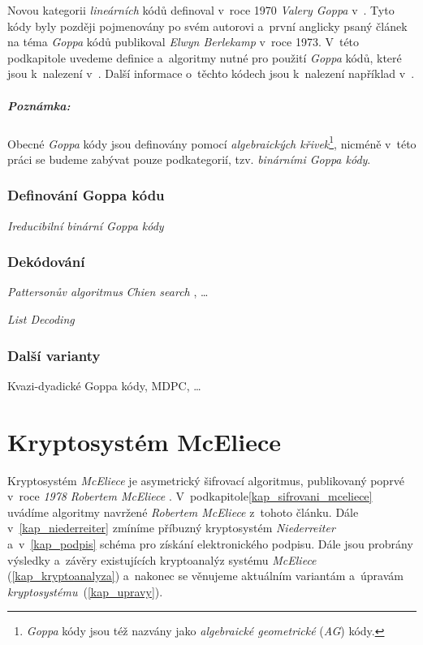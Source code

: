\documentclass[thesis=M,czech,hidelinks]{FITthesis}[2012/06/26]
\newcommand{\0}{{\textcolor[gray]{0.75}{0}}}
\begin{document}
Novou kategorii \emph{lineárních} kódů definoval v~roce 1970 \emph{Valery Goppa}
v~\cite{Goppa}. Tyto kódy byly později pojmenovány po svém autorovi a~první
anglicky psaný článek na téma \emph{Goppa} kódů publikoval \emph{Elwyn
Berlekamp} v~roce 1973. V~této podkapitole uvedeme definice a~algoritmy nutné
pro použití \emph{Goppa} kódů, které jsou k~nalezení
v~\cite{Berlekamp2,Engelbert}. Další informace o~těchto kódech jsou k~nalezení
například v~\cite{McEliece_coding}.

\paragraph{Poznámka:} Obecné \emph{Goppa} kódy jsou definovány pomocí
\emph{algebraických křivek}\footnote{
    \emph{Goppa} kódy jsou též nazvány jako \emph{algebraické geometrické}
    (\emph{AG}) kódy.
}, nicméně v~této práci se budeme zabývat pouze podkategorií, tzv.
\emph{binárními Goppa kódy}.

\subsection{Definování Goppa kódu}
\emph{Ireducibilní binární Goppa kódy}

\subsection{Dekódování}
\emph{Pattersonův algoritmus}
\cite{Patterson}
\emph{Chien search} , \ldots

\emph{List Decoding}  \cite{Repka,Bernstein2}

\subsection{Další varianty}
Kvazi-dyadické Goppa kódy, MDPC, \ldots




\chapter{Kryptosystém McEliece}\label{kap_mceliece}

Kryptosystém \emph{McEliece} je asymetrický šifrovací algoritmus, publikovaný
poprvé v~roce \emph{1978} \emph{Robertem McEliece} \cite{McEliece}.
V~podkapitole\ref{kap_sifrovani_mceliece} uvádíme algoritmy navržené
\emph{Robertem McEliece} z~tohoto článku. Dále v~\ref{kap_niederreiter} zmíníme
příbuzný kryptosystém \emph{Niederreiter} a~v~\ref{kap_podpis} schéma pro
získání elektronického podpisu. Dále jsou probrány výsledky a~závěry
existujících kryptoanalýz systému \emph{McEliece} (\ref{kap_kryptoanalyza})
a~nakonec se věnujeme aktuálním variantám a~úpravám
\emph{kryptosystému}~(\ref{kap_upravy}).
\end{document}
